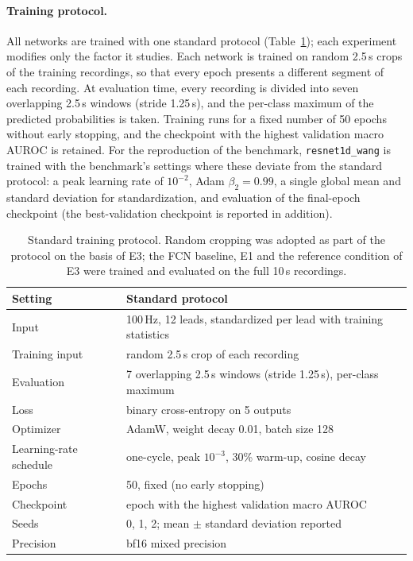 \documentclass{article}
\newcommand{\wang}{\texttt{resnet1d\_wang}}
\begin{document}
\paragraph{Training protocol.} All networks are trained with one standard protocol (Table~\ref{tab:protocol}); each experiment modifies only the factor it studies. Each network is trained on random 2.5\,s crops of the training recordings, so that every epoch presents a different segment of each recording. At evaluation time, every recording is divided into seven overlapping 2.5\,s windows (stride 1.25\,s), and the per-class maximum of the predicted probabilities is taken. Training runs for a fixed number of 50 epochs without early stopping, and the checkpoint with the highest validation macro AUROC is retained. For the reproduction of the benchmark, \wang{} is trained with the benchmark's settings where these deviate from the standard protocol: a peak learning rate of $10^{-2}$, Adam $\beta_2=0.99$, a single global mean and standard deviation for standardization, and evaluation of the final-epoch checkpoint (the best-validation checkpoint is reported in addition).

\begin{table}[htb]
  \caption{Standard training protocol. Random cropping was adopted as part of the protocol on the basis of E3; the FCN baseline, E1 and the reference condition of E3 were trained and evaluated on the full 10\,s recordings.}
  \label{tab:protocol}
  \centering\small
  \begin{tabular}{ll}
    \toprule
    Setting & Standard protocol \\
    \midrule
    Input & 100\,Hz, 12 leads, standardized per lead with training statistics \\
    Training input & random 2.5\,s crop of each recording \\
    Evaluation & 7 overlapping 2.5\,s windows (stride 1.25\,s), per-class maximum \\
    Loss & binary cross-entropy on 5 outputs \\
    Optimizer & AdamW, weight decay 0.01, batch size 128 \\
    Learning-rate schedule & one-cycle, peak $10^{-3}$, 30\% warm-up, cosine decay \\
    Epochs & 50, fixed (no early stopping) \\
    Checkpoint & epoch with the highest validation macro AUROC \\
    Seeds & 0, 1, 2; mean $\pm$ standard deviation reported \\
    Precision & bf16 mixed precision \\
    \bottomrule
  \end{tabular}
\end{table}
\end{document}
